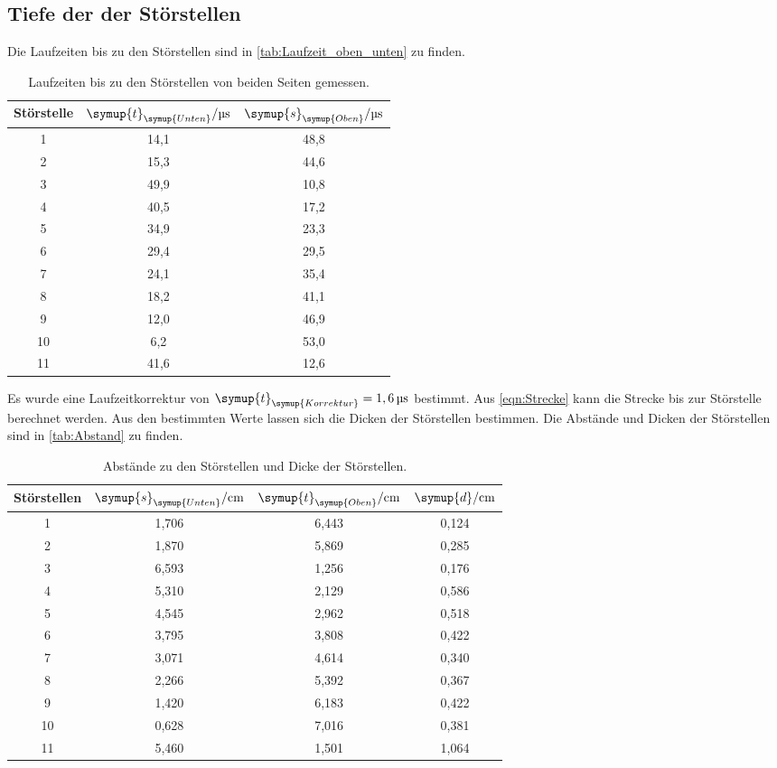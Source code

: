 \subsection{Tiefe der der Störstellen}
\label{sec:Tiefe}
Die Laufzeiten bis zu den Störstellen sind in \autoref{tab:Laufzeit_oben_unten} zu finden.
\begin{table}
  \centering
  \begin{tabular}{c c c }
    \toprule
    Störstelle & $\symup{t}_{\symup{Unten}}/\unit{\micro\second}$ & $\symup{s}_{\symup{Oben}}/\unit{\micro\second}$\\
    \midrule
     1 & 14,1 & 48,8 \\
     2 & 15,3 & 44,6 \\
     3 & 49,9 & 10,8 \\
     4 & 40,5 & 17,2 \\
     5 & 34,9 & 23,3 \\
     6 & 29,4 & 29,5 \\
     7 & 24,1 & 35,4 \\
     8 & 18,2 & 41,1 \\
     9 & 12,0 & 46,9 \\
    10 &  6,2 & 53,0 \\
    11 & 41,6 & 12,6 \\
    \bottomrule
  \end{tabular}
  \caption{Laufzeiten bis zu den Störstellen von beiden Seiten gemessen.}
  \label{tab:Laufzeit_oben_unten}
\end{table}
Es wurde eine Laufzeitkorrektur von $\symup{t}_{\symup{Korrektur}} = 1,6\,\unit{\micro\second}$ bestimmt.
Aus \autoref{eqn:Strecke} kann die Strecke bis zur Störstelle berechnet werden. Aus den bestimmten Werte lassen sich
die Dicken der Störstellen bestimmen. Die Abstände und Dicken der Störstellen sind in \autoref{tab:Abstand} zu finden.
\begin{table}
  \centering
  \begin{tabular}{c c c c}
    \toprule
    Störstellen & $\symup{s}_{\symup{Unten}}/\unit{\centi\meter}$ & $\symup{t}_{\symup{Oben}}/\unit{\centi\meter}$ & $\symup{d}/\unit{\centi\meter}$ \\
    \midrule
     1 & 1,706 & 6,443 & 0,124 \\
     2 & 1,870 & 5,869 & 0,285 \\
     3 & 6,593 & 1,256 & 0,176 \\
     4 & 5,310 & 2,129 & 0,586 \\
     5 & 4,545 & 2,962 & 0,518 \\
     6 & 3,795 & 3,808 & 0,422 \\
     7 & 3,071 & 4,614 & 0,340 \\
     8 & 2,266 & 5,392 & 0,367 \\
     9 & 1,420 & 6,183 & 0,422 \\
    10 & 0,628 & 7,016 & 0,381 \\
    11 & 5,460 & 1,501 & 1,064 \\
    \bottomrule
  \end{tabular}
  \caption{Abstände zu den Störstellen und Dicke der Störstellen.}
  \label{tab:Abstand}
\end{table}

